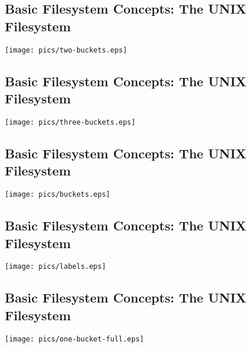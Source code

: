 \documentclass[xga]{xdvislides}
\begin{document}
\subsection{Basic Filesystem Concepts: The UNIX Filesystem}
\begin{center}
\texttt{[image: pics/two-buckets.eps]} \\
\end{center}

\subsection{Basic Filesystem Concepts: The UNIX Filesystem}
\vspace*{\fill}
\begin{center}
\texttt{[image: pics/three-buckets.eps]} \\
\end{center}
\vspace*{\fill}

\subsection{Basic Filesystem Concepts: The UNIX Filesystem}
\vspace*{\fill}
\begin{center}
\texttt{[image: pics/buckets.eps]} \\
\end{center}
\vspace*{\fill}

\subsection{Basic Filesystem Concepts: The UNIX Filesystem}
\vspace*{\fill}
\begin{center}
\texttt{[image: pics/labels.eps]} \\
\end{center}
\vspace*{\fill}

\subsection{Basic Filesystem Concepts: The UNIX Filesystem}
\begin{center}
\texttt{[image: pics/one-bucket-full.eps]} \\
\end{center}
\end{document}
